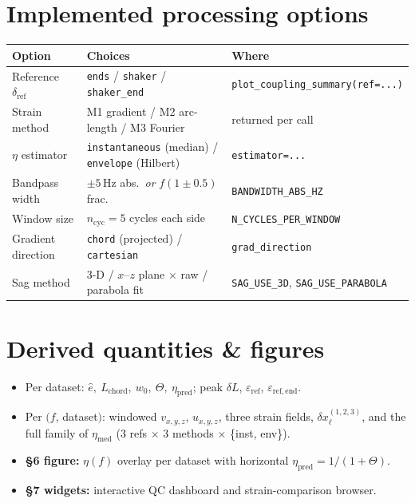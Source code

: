 \documentclass[11pt,a4paper]{article}
\newcommand{\unit}[1]{\,\mathrm{#1}}
\begin{document}
\section*{Implemented processing options}
\begin{table}[h]\centering\footnotesize
\begin{tabular}{@{}lll@{}}
\toprule
\textbf{Option} & \textbf{Choices} & \textbf{Where}\\\midrule
Reference $\delta_{\mathrm{ref}}$ & \texttt{ends} / \texttt{shaker} / \texttt{shaker\_end} & \texttt{plot\_coupling\_summary(ref=...)}\\
Strain method & M1 gradient / M2 arc-length / M3 Fourier & returned per call\\
$\eta$ estimator & \texttt{instantaneous} (median) / \texttt{envelope} (Hilbert) & \texttt{estimator=...}\\
Bandpass width & $\pm5\unit{Hz}$ abs.\ \emph{or} $f(1\pm0.5)$ frac. & \texttt{BANDWIDTH\_ABS\_HZ}\\
Window size & $n_{\mathrm{cyc}}=5$ cycles each side & \texttt{N\_CYCLES\_PER\_WINDOW}\\
Gradient direction & \texttt{chord} (projected) / \texttt{cartesian} & \texttt{grad\_direction}\\
Sag method & 3-D / $x$--$z$ plane $\times$ raw / parabola fit & \texttt{SAG\_USE\_3D}, \texttt{SAG\_USE\_PARABOLA}\\
\bottomrule
\end{tabular}
\end{table}

\section*{Derived quantities \& figures}
\begin{itemize}
\item Per dataset: $\hat e,\ L_{\mathrm{chord}},\ w_0,\ \Theta,\ \eta_{\mathrm{pred}}$; peak $\delta L$, $\varepsilon_{\mathrm{ref}}$, $\varepsilon_{\mathrm{ref,end}}$.
\item Per $(f$, dataset$)$: windowed $v_{x,y,z}$, $u_{x,y,z}$, three strain fields, $\delta x_\ell^{(1,2,3)}$, and the full family of $\eta_{\mathrm{med}}$ (3 refs $\times$ 3 methods $\times$ \{inst, env\}).
\item \textbf{\S6 figure:} $\eta(f)$ overlay per dataset with horizontal $\eta_{\mathrm{pred}}=1/(1+\Theta)$.
\item \textbf{\S7 widgets:} interactive QC dashboard and strain-comparison browser.
\end{itemize}
\end{document}

